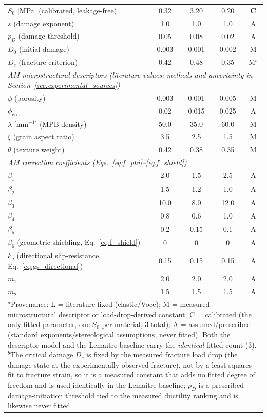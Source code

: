 \documentclass[12pt,a4paper,twocolumn]{article}
\begin{document}
\begin{table}[htbp]
{\begin{tabular}{lcccc}
$S_0$ [MPa] (calibrated, leakage-free) & 0.32 & 3.20 & 0.20 & \textbf{C} \\
$s$ (damage exponent) & 1.0 & 1.0 & 1.0 & A \\
$p_D$ (damage threshold) & 0.05 & 0.08 & 0.02 & A \\
$D_0$ (initial damage) & 0.003 & 0.001 & 0.002 & M \\
$D_c$ (fracture criterion) & 0.42 & 0.48 & 0.35 & M$^{b}$ \\
\midrule
\multicolumn{5}{l}{\emph{AM microstructural descriptors (literature values; methods and uncertainty in Section~\ref{sec:experimental_sources})}} \\
$\phi$ (porosity) & 0.003 & 0.001 & 0.005 & M \\
$\phi_{\mathrm{crit}}$ & 0.02 & 0.015 & 0.025 & A \\
$\lambda$ [mm$^{-1}$] (MPB density) & 50.0 & 35.0 & 60.0 & M \\
$\xi$ (grain aspect ratio) & 3.5 & 2.5 & 1.5 & M \\
$\theta$ (texture weight) & 0.42 & 0.38 & 0.35 & M \\
\midrule
\multicolumn{5}{l}{\emph{AM correction coefficients (Eqs.~\eqref{eq:f_phi}--\eqref{eq:f_shield})}} \\
$\beta_1$ & 2.0 & 1.5 & 2.5 & A \\
$\beta_2$ & 1.5 & 1.2 & 1.0 & A \\
$\beta_3$ & 10.0 & 8.0 & 12.0 & A \\
$\beta_4$ & 0.8 & 0.6 & 1.0 & A \\
$\beta_5$ & 0.2 & 0.15 & 0.1 & A \\
$\beta_6$ (geometric shielding, Eq.~\eqref{eq:f_shield}) & 0 & 0 & 0 & A \\
$k_g$ (directional slip-resistance, Eq.~\eqref{eq:gs_directional}) & 0.15 & 0.15 & 0.15 & A \\
$m_1$ & 2.0 & 2.0 & 2.0 & A \\
$m_2$ & 1.5 & 1.5 & 1.5 & A \\
\bottomrule
\multicolumn{5}{p{0.97\textwidth}}{\footnotesize $^{a}$Provenance: L = literature-fixed (elastic/Voce); M = measured microstructural descriptor or load-drop-derived constant; C = calibrated (the only fitted parameter, one $S_0$ per material, 3 total); A = assumed/prescribed (standard exponents/stereological assumptions, never fitted). Both the descriptor model and the Lemaitre baseline carry the \emph{identical} fitted count (3). $^{b}$The critical damage $D_c$ is fixed by the measured fracture load drop (the damage state at the experimentally observed fracture), not by a least-squares fit to fracture strain, so it is a measured constant that adds no fitted degree of freedom and is used identically in the Lemaitre baseline; $p_D$ is a prescribed damage-initiation threshold tied to the measured ductility ranking and is likewise never fitted.} \\
\end{tabular}%
}
\end{table}
\end{document}
